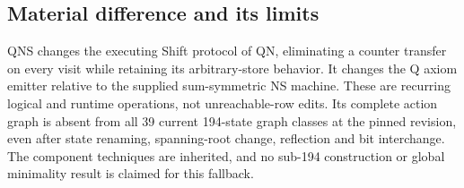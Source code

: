 \subsection{Material difference and its limits}

QNS changes the executing Shift protocol of QN, eliminating a counter
transfer on every visit while retaining its arbitrary-store behavior.
It changes the Q axiom emitter relative to the supplied sum-symmetric
NS machine. These are recurring logical and runtime operations, not
unreachable-row edits. Its complete action graph is absent from all 39
current 194-state graph classes at the pinned revision, even after
state renaming, spanning-root change, reflection and bit interchange.
The component techniques are inherited, and no sub-194 construction or
global minimality result is claimed for this fallback.
